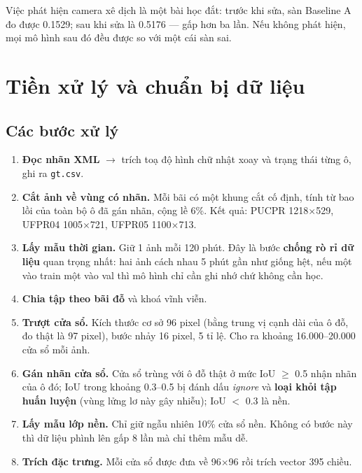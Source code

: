 \documentclass[12pt]{ai_conquer2026}
\begin{document}
Việc phát hiện camera xê dịch là một bài học đắt: trước khi sửa, sàn Baseline A đo được 0.1529; sau khi sửa là 0.5176 --- gấp hơn ba lần. Nếu không phát hiện, mọi mô hình sau đó đều được so với một cái sàn sai.

\newpage
\section{Tiền xử lý và chuẩn bị dữ liệu}

\subsection{Các bước xử lý}

\begin{enumerate}
\item \textbf{Đọc nhãn XML} $\rightarrow$ trích toạ độ hình chữ nhật xoay và trạng thái từng ô, ghi ra \texttt{gt.csv}.

\item \textbf{Cắt ảnh về vùng có nhãn.} Mỗi bãi có một khung cắt cố định, tính từ bao lồi của toàn bộ ô đã gán nhãn, cộng lề 6\%. Kết quả: PUCPR 1218$\times$529, UFPR04 1005$\times$721, UFPR05 1100$\times$713.

\item \textbf{Lấy mẫu thời gian.} Giữ 1 ảnh mỗi 120 phút. Đây là bước \textbf{chống rò rỉ dữ liệu} quan trọng nhất: hai ảnh cách nhau 5 phút gần như giống hệt, nếu một vào train một vào val thì mô hình chỉ cần ghi nhớ chứ không cần học.

\item \textbf{Chia tập theo bãi đỗ} và khoá vĩnh viễn.

\item \textbf{Trượt cửa sổ.} Kích thước cơ sở 96 pixel (bằng trung vị cạnh dài của ô đỗ, đo thật là 97 pixel), bước nhảy 16 pixel, 5 tỉ lệ. Cho ra khoảng 16.000--20.000 cửa sổ mỗi ảnh.

\item \textbf{Gán nhãn cửa sổ.} Cửa sổ trùng với ô đỗ thật ở mức IoU $\geq$ 0.5 nhận nhãn của ô đó; IoU trong khoảng 0.3--0.5 bị đánh dấu \textit{ignore} và \textbf{loại khỏi tập huấn luyện} (vùng lửng lơ này gây nhiễu); IoU $<$ 0.3 là nền.

\item \textbf{Lấy mẫu lớp nền.} Chỉ giữ ngẫu nhiên 10\% cửa sổ nền. Không có bước này thì dữ liệu phình lên gấp 8 lần mà chỉ thêm mẫu dễ.

\item \textbf{Trích đặc trưng.} Mỗi cửa sổ được đưa về 96$\times$96 rồi trích vector 395 chiều.
\end{enumerate}
\end{document}
